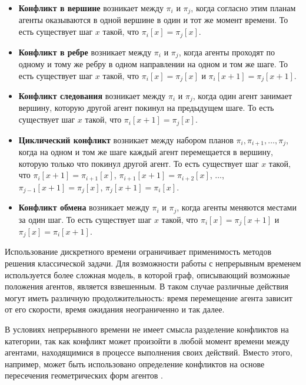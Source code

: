 \begin{itemize}
    \item \textbf{Конфликт в вершине} возникает между $\pi_i$ и $\pi_j$, 
    когда согласно этим планам агенты оказываются в одной вершине в один и тот же момент
    времени. То есть существует шаг $x$ такой, что $\pi_i[x] = \pi_j[x]$.

    \item \textbf{Конфликт в ребре} возникает между $\pi_i$ и $\pi_j$, 
    когда агенты проходят по одному и тому же ребру в одном направлении на одном и том же
    шаге. То есть существует шаг $x$ такой, что $\pi_i[x] = \pi_j[x]$ и $\pi_i[x+1] = \pi_j[x+1]$.

    \item \textbf{Конфликт следования} возникает между $\pi_i$ и $\pi_j$, 
    когда один агент занимает вершину, которую другой агент покинул на предыдущем шаге.
    То есть существует шаг $x$ такой, что $\pi_i[x+1] = \pi_j[x]$.

    \item \textbf{Циклический конфликт} возникает между набором планов
    $\pi_i, \pi_{i+1}, \ldots, \pi_j$, когда на одном и том же шаге
    каждый агент перемещается в вершину, которую только что покинул другой агент. 
    То есть существует шаг $x$ такой, что 
    $\pi_i[x+1] = \pi_{i+1}[x]$, \; $\pi_{i+1}[x+1] = \pi_{i+2}[x]$, \; $\ldots$, \;
    $\pi_{j-1}[x+1] = \pi_j[x]$, \; $\pi_j[x+1] = \pi_i[x]$.

    \item \textbf{Конфликт обмена} возникает между $\pi_i$ и $\pi_j$, когда агенты меняются 
    местами за один шаг. То есть существует шаг $x$ такой, что
    $\pi_i[x] = \pi_j[x+1]$ и $\pi_j[x] = \pi_i[x+1]$.
\end{itemize}

Использование дискретного времени ограничивает применимость методов решения классической задачи. 
Для возможности работы с непрерывным временем используется более сложная модель, в которой граф, 
описывающий возможные положения агентов, является взвешенным. В таком случае различные действия 
могут иметь различную продолжительность: время перемещение агента зависит от его скорости, время 
ожидания неограниченно и так далее.

В условиях непрерывного времени не имеет смысла разделение конфликтов на категории, так как конфликт 
может произойти в любой момент времени между агентами, находящимися в процессе выполнения своих действий. 
Вместо этого, например, может быть использовано определение конфликтов на основе пересечения 
геометрических форм агентов \cite{ccbs}.


